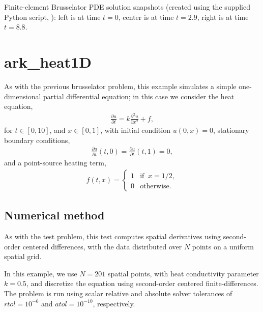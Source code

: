 \documentclass[letterpaper,10pt,english]{sphinxmanual}
\begin{document}
\noindent{}

Finite-element Brusselator PDE solution snapshots (created using the
supplied Python script, ): left is at time
\(t=0\), center is at time \(t=2.9\), right is at time
\(t=8.8\).


\section{ark\_heat1D}
\label{\detokenize{c_serial:ark-heat1d}}\label{\detokenize{c_serial:id25}}
As with the previous brusselator problem, this example simulates a
simple one-dimensional partial differential equation; in this case we
consider the heat equation,
\begin{equation*}
\begin{split}\frac{\partial u}{\partial t} = k \frac{\partial^2 u}{\partial x^2} + f,\end{split}
\end{equation*}
for \(t \in [0, 10]\), and \(x \in [0, 1]\), with initial
condition \(u(0,x) = 0\), stationary boundary conditions,
\begin{equation*}
\begin{split}\frac{\partial u}{\partial t}(t,0) = \frac{\partial u}{\partial t}(t,1) = 0,\end{split}
\end{equation*}
and a point-source heating term,
\begin{equation*}
\begin{split}f(t,x) = \begin{cases} 1 & \text{if}\;\; x=1/2, \\
                       0 & \text{otherwise}. \end{cases}\end{split}
\end{equation*}

\subsection{Numerical method}
\label{\detokenize{c_serial:id26}}
As with the {\hyperref[\detokenize{c_serial:ark-brusselator1d}]{}} test problem, this test computes
spatial derivatives using second-order centered differences, with the
data distributed over \(N\) points on a uniform spatial grid.

In this example, we use \(N=201\) spatial points, with heat
conductivity parameter \(k=0.5\), and discretize the equation
using second-order centered finite-differences.  The problem is run
using scalar relative and absolute solver tolerances of
\(rtol=10^{-6}\) and \(atol=10^{-10}\), respectively.
\end{document}
